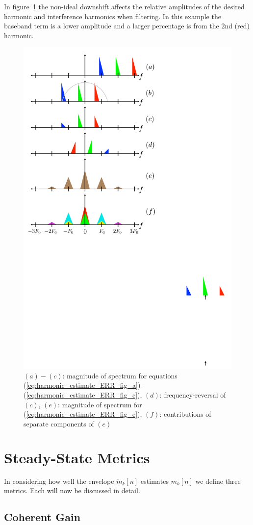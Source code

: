 \documentclass [11pt, proquest,oneside] {ganter_thesis}[2015/03/03]
\begin{document}
In figure~\ref{fig:downshift_effects} the non-ideal downshift affects the relative amplitudes of the desired harmonic and interference harmonics when filtering.  In this example the baseband term is a lower amplitude and a larger percentage is from the 2nd (red) harmonic.

\begin{figure}[!ht]
  \centering
    \includegraphics[width=.62\textwidth]{downshift_effects} 
    \caption{$(a)-(c)$: magnitude of spectrum for equations (\ref{eq:harmonic_estimate_ERR_fig_a}) - (\ref{eq:harmonic_estimate_ERR_fig_c}), $(d)$: frequency-reversal of $(c)$, $(e)$: magnitude of spectrum for (\ref{eq:harmonic_estimate_ERR_fig_e}), $(f)$: contributions of separate components of $(e)$}\label{fig:downshift_effects}
\end{figure}

\clearpage

\section{Steady-State Metrics}

In considering how well the envelope $\tilde{m}_k[n]$ estimates $m_k[n]$ we define three metrics.  Each will now be discussed in detail.

\subsection{Coherent Gain}
\end{document}
